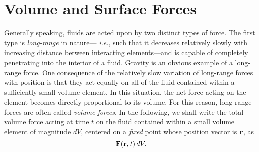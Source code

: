 \section{Volume and Surface Forces}\label{s5.4}
Generally speaking, fluids are acted upon by two distinct types of force. The first type is {\em long-range}\/ in nature---{\em
i.e.}, such that it decreases relatively slowly with increasing distance between interacting elements---and is
capable of completely penetrating into the interior of a fluid.  Gravity
is an obvious example of a long-range force. One consequence of the relatively slow variation of
long-range forces with position  is that they
act equally on all of the fluid contained within a sufficiently small volume element.  In this situation, the net force 
acting on the element becomes directly proportional to its volume. For this reason, long-range forces are often called {\em volume  forces}. In the following, we shall write the total  volume force acting at time $t$ on the fluid contained within a
small volume element of magnitude $d V$, centered on a {\em fixed}\/ point whose position vector is ${\bf r}$,
as
\begin{equation}
{\bf F}({\bf r},t)\,d V.
\end{equation}

